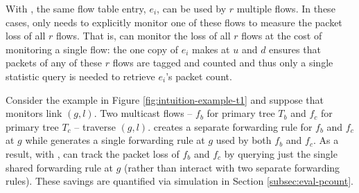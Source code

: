 
With \merges, the same flow table entry, $e_i$, can be used by $r$ multiple flows.  In these cases, \pcnt only needs to explicitly monitor one of these flows to measure
the packet loss of all $r$ flows.  That is, \pcnt can monitor the loss of all $r$ flows at the cost of monitoring a single flow:
the one copy of $e_i$ \pcnt makes at $u$ and $d$ ensures that packets of any of these $r$ flows are tagged and counted and
thus only a single statistic query is needed to retrieve $e_i$'s packet count.

Consider the example in Figure \ref{fig:intuition-example-t1} and suppose that \pcnt monitors link $(g,l)$. 
Two multicast flows -- $f_b$ for primary tree $T_b$ and $f_c$ for primary tree $T_c$ -- traverse
$(g,l)$.  \base creates a separate forwarding rule for $f_b$ and $f_c$ at $g$ while \merge generates a single forwarding rule at $g$ used by both $f_b$ and $f_c$.  As a result, 
with \merges, \pcnt can track the  packet loss of $f_b$ and $f_c$ by querying just the single shared \merge forwarding rule at $g$ (rather than interact with two separate \base forwarding rules).
These savings are quantified via simulation in Section \ref{subsec:eval-pcount}.





